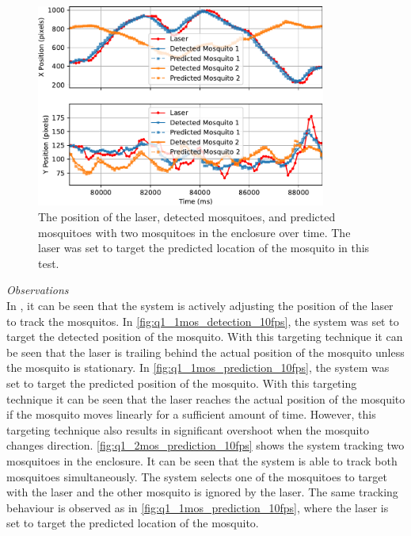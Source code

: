 \begin{figure}[!htb]
  \centering
  \includegraphics[width=0.85\textwidth]{figures/results/q1_2mos_prediction_10fps.pdf}
  \caption{The position of the laser, detected mosquitoes, and predicted mosquitoes with two mosquitoes in the enclosure over time. The laser was set to target the predicted location of the mosquito in this test.}
  \label{fig:q1_2mos_prediction_10fps}
\end{figure}

\textit{Observations}\\
In , it can be seen that the system is actively adjusting the position of the laser to track the mosquitos. In \autoref{fig:q1_1mos_detection_10fps}, the system was set to target the detected position of the mosquito. With this targeting technique it can be seen that the laser is trailing behind the actual position of the mosquito unless the mosquito is stationary. In \autoref{fig:q1_1mos_prediction_10fps}, the system was set to target the predicted position of the mosquito. With this targeting technique it can be seen that the laser reaches the actual position of the mosquito if the mosquito moves linearly for a sufficient amount of time. However, this targeting technique also results in significant overshoot when the mosquito changes direction. \autoref{fig:q1_2mos_prediction_10fps} shows the system tracking two mosquitoes in the enclosure. It can be seen that the system is able to track both mosquitoes simultaneously. The system selects one of the mosquitoes to target with the laser and the other mosquito is ignored by the laser. The same tracking behaviour is observed as in \autoref{fig:q1_1mos_prediction_10fps}, where the laser is set to target the predicted location of the mosquito.

